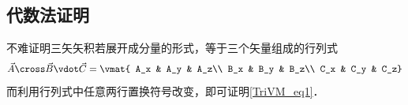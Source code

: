 \subsection{代数法证明}
不难证明三矢矢积若展开成分量的形式，等于三个矢量组成的行列式
\begin{equation}
\vec A \cross \vec B \vdot \vec C = \vmat{
A_x & A_y & A_z\\
B_x & B_y & B_z\\
C_x & C_y & C_z}
\end{equation}
而利用行列式中任意两行置换符号改变，即可证明\autoref{TriVM_eq1}．


